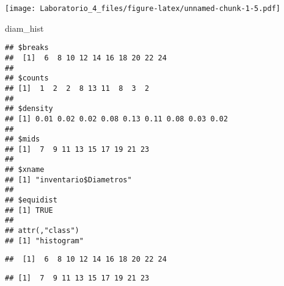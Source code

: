 \documentclass[
]{article}
\newenvironment{Shaded}{\begin{snugshade}}{\end{snugshade}}
\newcommand{\CommentTok}[1]{\textcolor[rgb]{0.56,0.35,0.01}{\textit{#1}}}
\newcommand{\NormalTok}[1]{#1}
\newcommand{\SpecialCharTok}[1]{\textcolor[rgb]{0.00,0.00,0.00}{#1}}
\begin{document}
\texttt{[image: Laboratorio\_4\_files/figure-latex/unnamed-chunk-1-5.pdf]}

\begin{Shaded}
\begin{Highlighting}[]
\NormalTok{diam\_hist}
\end{Highlighting}
\end{Shaded}

\begin{verbatim}
## $breaks
##  [1]  6  8 10 12 14 16 18 20 22 24
## 
## $counts
## [1]  1  2  2  8 13 11  8  3  2
## 
## $density
## [1] 0.01 0.02 0.02 0.08 0.13 0.11 0.08 0.03 0.02
## 
## $mids
## [1]  7  9 11 13 15 17 19 21 23
## 
## $xname
## [1] "inventario$Diametros"
## 
## $equidist
## [1] TRUE
## 
## attr(,"class")
## [1] "histogram"
\end{verbatim}

\begin{Shaded}
\end{Shaded}

\begin{verbatim}
##  [1]  6  8 10 12 14 16 18 20 22 24
\end{verbatim}

\begin{Shaded}
\end{Shaded}

\begin{verbatim}
## [1]  7  9 11 13 15 17 19 21 23
\end{verbatim}

\begin{Shaded}
\end{Shaded}
\end{document}
